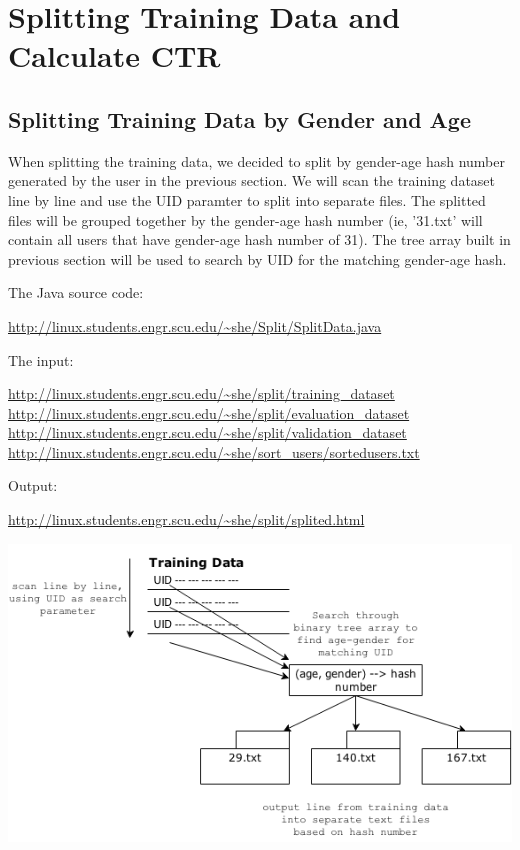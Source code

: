 \documentclass{article} %
\begin{document}
\section{Splitting Training Data and Calculate CTR}

\subsection{Splitting Training Data by Gender and Age}
When splitting the training data, we decided to split by gender-age hash number generated by the user in the previous section. We will scan the training dataset line by line and use the UID paramter to split into separate files. The splitted files will be grouped together by the gender-age hash number (ie, '31.txt' will contain all users that have gender-age hash number of 31). The tree array built in previous section will be used to search by UID for the matching gender-age hash. 

The Java source code:
\begin{center}
  \url{http://linux.students.engr.scu.edu/~she/Split/SplitData.java}
\end{center}

The input:
\begin{center}
  \url{http://linux.students.engr.scu.edu/~she/split/training_dataset}
  \url{http://linux.students.engr.scu.edu/~she/split/evaluation_dataset}
  \url{http://linux.students.engr.scu.edu/~she/split/validation_dataset}
  \url{http://linux.students.engr.scu.edu/~she/sort_users/sortedusers.txt}
\end{center}

Output:
\begin{center}
  \url{http://linux.students.engr.scu.edu/~she/split/splited.html}
\end{center}

\includegraphics[scale=0.65]{TrainingData.png}
\end{document}
